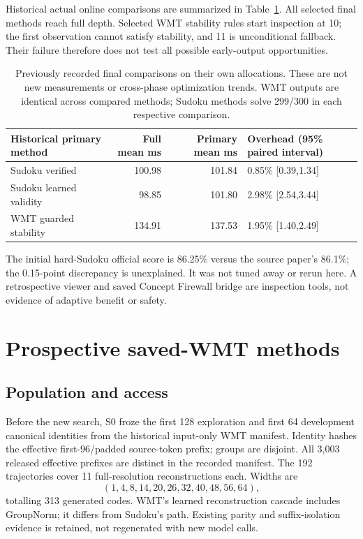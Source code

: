 \documentclass[11pt]{article}
\begin{document}
Historical actual online comparisons are summarized in Table~\ref{tab:historical}. All selected final methods reach full depth. Selected WMT stability rules start inspection at 10; the first observation cannot satisfy stability, and 11 is unconditional fallback. Their failure therefore does not test all possible early-output opportunities.

\begin{table}[ht]
\centering\small
\begin{tabular}{lrrl}
\toprule
Historical primary method & Full mean ms & Primary mean ms & Overhead (95\% paired interval)\\
\midrule
Sudoku verified &100.98&101.84&0.85\% [0.39,1.34]\\
Sudoku learned validity &98.85&101.80&2.98\% [2.54,3.44]\\
WMT guarded stability &134.91&137.53&1.95\% [1.40,2.49]\\
\bottomrule
\end{tabular}
\caption{Previously recorded final comparisons on their own allocations. These are not new measurements or cross-phase optimization trends. WMT outputs are identical across compared methods; Sudoku methods solve 299/300 in each respective comparison.}
\label{tab:historical}
\end{table}

The initial hard-Sudoku official score is 86.25\% versus the source paper's 86.1\%; the 0.15-point discrepancy is unexplained. It was not tuned away or rerun here. A retrospective viewer and saved Concept Firewall bridge are inspection tools, not evidence of adaptive benefit or safety.

\section{Prospective saved-WMT methods}
\subsection{Population and access}
Before the new search, S0 froze the first 128 exploration and first 64 development canonical identities from the historical input-only WMT manifest. Identity hashes the effective first-96/padded source-token prefix; groups are disjoint. All 3,003 released effective prefixes are distinct in the recorded manifest. The 192 trajectories cover 11 full-resolution reconstructions each. Widths are
\[
(1,4,8,14,20,26,32,40,48,56,64),
\]
totalling 313 generated codes. WMT's learned reconstruction cascade includes GroupNorm; it differs from Sudoku's path. Existing parity and suffix-isolation evidence is retained, not regenerated with new model calls.
\end{document}

